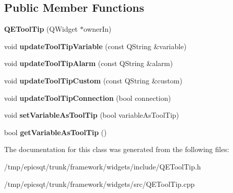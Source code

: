 \subsection*{Public Member Functions}
\begin{DoxyCompactItemize}
\item 
\hypertarget{classQEToolTip_a32ccf27a8548c12154fb646381bc732f}{
{\bfseries QEToolTip} (QWidget $\ast$ownerIn)}
\label{classQEToolTip_a32ccf27a8548c12154fb646381bc732f}

\item 
\hypertarget{classQEToolTip_a494b1517fd4d15e5122d2b726d1a168e}{
void {\bfseries updateToolTipVariable} (const QString \&variable)}
\label{classQEToolTip_a494b1517fd4d15e5122d2b726d1a168e}

\item 
\hypertarget{classQEToolTip_a4624137764338aac233a27c249da9810}{
void {\bfseries updateToolTipAlarm} (const QString \&alarm)}
\label{classQEToolTip_a4624137764338aac233a27c249da9810}

\item 
\hypertarget{classQEToolTip_a1d2fbc21e2b5e8826bbcdf49508a9ab6}{
void {\bfseries updateToolTipCustom} (const QString \&custom)}
\label{classQEToolTip_a1d2fbc21e2b5e8826bbcdf49508a9ab6}

\item 
\hypertarget{classQEToolTip_a75414b2458077f538ce4f9d3fd2db355}{
void {\bfseries updateToolTipConnection} (bool connection)}
\label{classQEToolTip_a75414b2458077f538ce4f9d3fd2db355}

\item 
\hypertarget{classQEToolTip_a11f362ac255e1181420b1f43cf6fb397}{
void {\bfseries setVariableAsToolTip} (bool variableAsToolTip)}
\label{classQEToolTip_a11f362ac255e1181420b1f43cf6fb397}

\item 
\hypertarget{classQEToolTip_aae86fa0921fcc23f4f2c06fbe7800864}{
bool {\bfseries getVariableAsToolTip} ()}
\label{classQEToolTip_aae86fa0921fcc23f4f2c06fbe7800864}

\end{DoxyCompactItemize}


The documentation for this class was generated from the following files:\begin{DoxyCompactItemize}
\item 
/tmp/epicsqt/trunk/framework/widgets/include/QEToolTip.h\item 
/tmp/epicsqt/trunk/framework/widgets/src/QEToolTip.cpp\end{DoxyCompactItemize}
